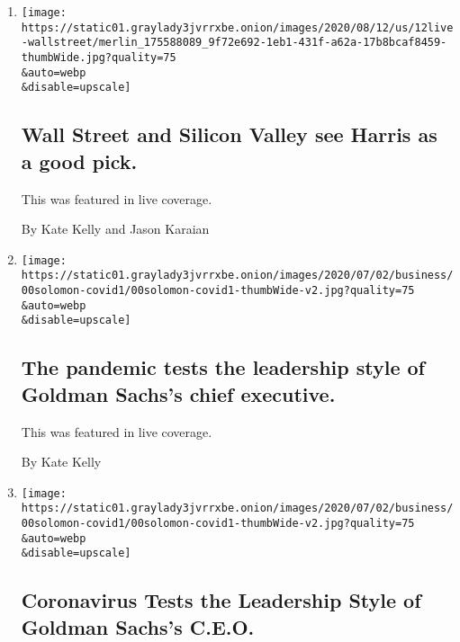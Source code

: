 \begin{enumerate}
\def\labelenumi{\arabic{enumi}.}
\item
  \href{/live/2020/08/12/us/biden-vs-trump/wall-street-and-silicon-valley-see-harris-as-a-good-pick}{}

  \texttt{[image: https://static01.graylady3jvrrxbe.onion/images/2020/08/12/us/12live-wallstreet/merlin\_175588089\_9f72e692-1eb1-431f-a62a-17b8bcaf8459-thumbWide.jpg?quality=75\\\&auto=webp\\\&disable=upscale]}

  \hypertarget{wall-street-and-silicon-valley-see-harris-as-a-good-pick}{%
  \subsection{Wall Street and Silicon Valley see Harris as a good
  pick.}\label{wall-street-and-silicon-valley-see-harris-as-a-good-pick}}

  This was featured in live coverage.

  By Kate Kelly and Jason Karaian
\item
  \href{/live/2020/08/11/business/stock-market-today-coronavirus/the-pandemic-tests-the-leadership-style-of-goldman-sachss-chief-executive}{}

  \texttt{[image: https://static01.graylady3jvrrxbe.onion/images/2020/07/02/business/00solomon-covid1/00solomon-covid1-thumbWide-v2.jpg?quality=75\\\&auto=webp\\\&disable=upscale]}

  \hypertarget{the-pandemic-tests-the-leadership-style-of-goldman-sachss-chief-executive}{%
  \subsection{The pandemic tests the leadership style of Goldman Sachs's
  chief
  executive.}\label{the-pandemic-tests-the-leadership-style-of-goldman-sachss-chief-executive}}

  This was featured in live coverage.

  By Kate Kelly
\item
  \href{/2020/08/11/business/goldman-sachs-david-solomon-coronavirus.html}{}

  \texttt{[image: https://static01.graylady3jvrrxbe.onion/images/2020/07/02/business/00solomon-covid1/00solomon-covid1-thumbWide-v2.jpg?quality=75\\\&auto=webp\\\&disable=upscale]}

  \hypertarget{coronavirus-tests-the-leadership-style-of-goldman-sachss-ceo}{%
  \subsection{Coronavirus Tests the Leadership Style of Goldman Sachs's
  C.E.O.}\label{coronavirus-tests-the-leadership-style-of-goldman-sachss-ceo}}


\end{enumerate}
